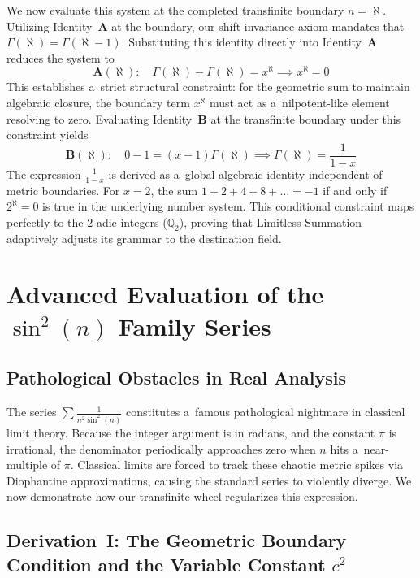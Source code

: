 \documentclass[11pt,a4paper]{article}
\theoremstyle{definition}
\theoremstyle{noperiod}
\begin{document}
We now evaluate this system at the completed transfinite boundary $n = \aleph$. Utilizing Identity~$\mathbf{A}$ at the boundary, our shift invariance axiom mandates that $\Gamma(\aleph) = \Gamma(\aleph-1)$. Substituting this identity directly into Identity~$\mathbf{A}$ reduces the system to
\begin{equation}
\mathbf{A}(\aleph): \quad \Gamma(\aleph) - \Gamma(\aleph) = x^\aleph \implies x^\aleph = 0
\end{equation}
This establishes a~strict structural constraint: for the geometric sum to maintain algebraic closure, the boundary term $x^\aleph$ must act as a~nilpotent-like element resolving to zero. Evaluating Identity~$\mathbf{B}$ at the transfinite boundary under this constraint yields
\begin{equation}
\mathbf{B}(\aleph): \quad 0 - 1 = (x-1)\Gamma(\aleph) \implies \Gamma(\aleph) = \frac{1}{1-x}
\end{equation}
The expression $\frac{1}{1-x}$ is derived as a~global algebraic identity independent of metric boundaries. For $x=2$, the sum $1+2+4+8+\dots = -1$ if and only if $2^\aleph = 0$ is true in the underlying number system. This conditional constraint maps perfectly to the $2$-adic integers ($\mathbb{Q}_2$), proving that Limitless Summation adaptively adjusts its grammar to the destination field.

\section{Advanced Evaluation of the $\sin^2(n)$ Family Series}

\subsection{Pathological Obstacles in Real Analysis}

The series $\sum \frac{1}{n^2 \sin^2(n)}$ constitutes a~famous pathological nightmare in classical limit theory. Because the integer argument is in radians, and the constant $\pi$ is irrational, the denominator periodically approaches zero when $n$ hits a~near-multiple of $\pi$. Classical limits are forced to track these chaotic metric spikes via Diophantine approximations, causing the standard series to violently diverge. We now demonstrate how our transfinite wheel regularizes this expression.

\subsection{Derivation~I: The Geometric Boundary Condition and the Variable Constant $c^2$}
\end{document}
